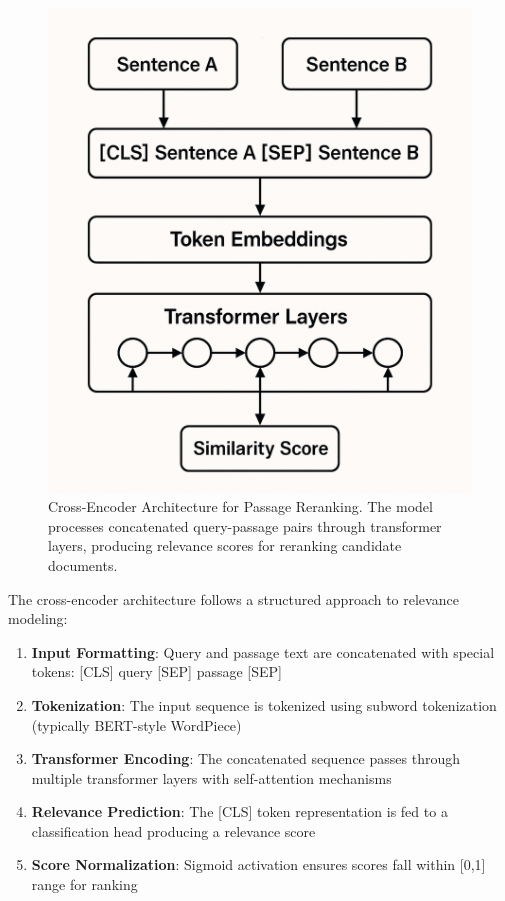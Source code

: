 \begin{figure}[H]
    \centering
    \includegraphics[width=\textwidth]{Figures/cross_encoder_archi.png}
    \captionsetup{font=footnotesize, width=0.9\linewidth}
    \caption{Cross-Encoder Architecture for Passage Reranking. The model processes concatenated query-passage pairs through transformer layers, producing relevance scores for reranking candidate documents.}
    \label{fig:cross_encoder_architecture}
\end{figure}

The cross-encoder architecture follows a structured approach to relevance modeling:

\begin{enumerate}
    \item \textbf{Input Formatting}: Query and passage text are concatenated with special tokens: [CLS] query [SEP] passage [SEP]
    \item \textbf{Tokenization}: The input sequence is tokenized using subword tokenization (typically BERT-style WordPiece)
    \item \textbf{Transformer Encoding}: The concatenated sequence passes through multiple transformer layers with self-attention mechanisms
    \item \textbf{Relevance Prediction}: The [CLS] token representation is fed to a classification head producing a relevance score
    \item \textbf{Score Normalization}: Sigmoid activation ensures scores fall within [0,1] range for ranking
\end{enumerate}

